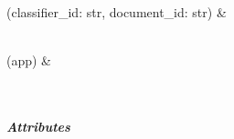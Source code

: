 \documentclass[letterpaper,10pt,english]{sphinxmanual}
\begin{document}
\begin{savenotes}
\begin{longtable}[c]{}
\\
\hline
\sphinxAtStartPar
{\hyperref[\detokenize{autoapi/pine/backend/pipelines/bp/index:pine.backend.pipelines.bp.advance_to_next_document_by_classifier}]{}}(classifier\_id: str, document\_id: str)
&
\sphinxAtStartPar

\\
\hline
\sphinxAtStartPar
{\hyperref[\detokenize{autoapi/pine/backend/pipelines/bp/index:pine.backend.pipelines.bp.init_app}]{}}(app)
&
\sphinxAtStartPar

\\
\hline
\end{longtable}\sphinxatlongtableend\end{savenotes}


\subparagraph{Attributes}
\label{\detokenize{autoapi/pine/backend/pipelines/bp/index:attributes}}
\end{document}
